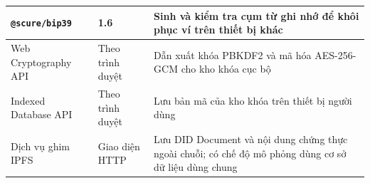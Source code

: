\begin{longtable}{|p{3.4cm}|p{2.9cm}|p{7.3cm}|}
\texttt{@scure/bip39}
& 1.6
& Sinh và kiểm tra cụm từ ghi nhớ để khôi phục ví trên thiết bị khác \\
\hline

Web Cryptography API
& Theo trình duyệt
& Dẫn xuất khóa PBKDF2 và mã hóa AES-256-GCM cho kho khóa cục bộ \\
\hline

Indexed Database API
& Theo trình duyệt
& Lưu bản mã của kho khóa trên thiết bị người dùng \\
\hline

Dịch vụ ghim IPFS
& Giao diện HTTP
& Lưu DID Document và nội dung chứng thực ngoài chuỗi; có chế độ mô phỏng dùng cơ sở dữ liệu dùng chung \\
\hline

\end{longtable}
